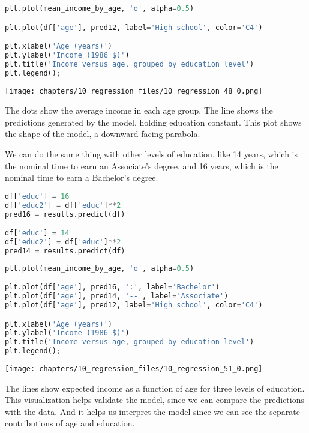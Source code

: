 \begin{lstlisting}[language=Python,style=source]
plt.plot(mean_income_by_age, 'o', alpha=0.5)

plt.plot(df['age'], pred12, label='High school', color='C4')

plt.xlabel('Age (years)')
plt.ylabel('Income (1986 $)')
plt.title('Income versus age, grouped by education level')
plt.legend();
\end{lstlisting}

\begin{center}
\texttt{[image: chapters/10\_regression\_files/10\_regression\_48\_0.png]}
\end{center}

The dots show the average income in each age group. The line shows the
predictions generated by the model, holding education constant. This
plot shows the shape of the model, a downward-facing parabola.

We can do the same thing with other levels of education, like 14 years,
which is the nominal time to earn an Associate's degree, and 16 years,
which is the nominal time to earn a Bachelor's degree.

\begin{lstlisting}[language=Python,style=source]
df['educ'] = 16
df['educ2'] = df['educ']**2
pred16 = results.predict(df)

df['educ'] = 14
df['educ2'] = df['educ']**2
pred14 = results.predict(df)
\end{lstlisting}

\begin{lstlisting}[language=Python,style=source]
plt.plot(mean_income_by_age, 'o', alpha=0.5)

plt.plot(df['age'], pred16, ':', label='Bachelor')
plt.plot(df['age'], pred14, '--', label='Associate')
plt.plot(df['age'], pred12, label='High school', color='C4')

plt.xlabel('Age (years)')
plt.ylabel('Income (1986 $)')
plt.title('Income versus age, grouped by education level')
plt.legend();
\end{lstlisting}

\begin{center}
\texttt{[image: chapters/10\_regression\_files/10\_regression\_51\_0.png]}
\end{center}

The lines show expected income as a function of age for three levels of
education. This visualization helps validate the model, since we can
compare the predictions with the data. And it helps us interpret the
model since we can see the separate contributions of age and education.

